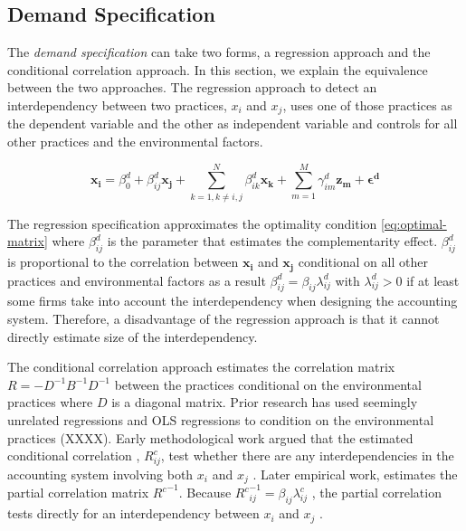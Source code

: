 \documentclass[12pt]{article}
\begin{document}
\subsection{Demand Specification}\label{demand-specification}

The \emph{demand specification} can take two forms, a regression approach and the conditional correlation approach. In this section, we explain the equivalence between the two approaches. The regression  approach to detect an interdependency between two practices, $x_i$ and $x_j$, uses one of those practices as the dependent variable and the other as independent variable and controls for all other practices and the environmental factors.

\begin{equation} \label{eq:demand-specification}
\mathbf{x_i} = \beta_0^d + \beta_{ij}^d \mathbf{x_j} 
		+ \sum_{k = 1, k \neq i,j}^N \beta_{ik}^d \mathbf{x_k} 
        + \sum_{m = 1}^M \gamma_{im}^d \mathbf{z_m}
        + \mathbf{\epsilon^d}
\end{equation}

The regression specification approximates the optimality condition  \eqref{eq:optimal-matrix} where \(\beta^d_{ij}\) is the parameter that estimates the complementarity effect. $\beta_{ij}^d$ is proportional to the  correlation between $\mathbf{x_i}$ and $\mathbf{x_j}$ conditional on all other practices and environmental factors as a result  $\beta^d_{ij} = \beta_{ij} \lambda^d_{ij}$ with $\lambda^d_{ij} > 0$ if at least some firms take into account the interdependency when designing the accounting system. Therefore, a disadvantage of the regression approach is that it cannot directly estimate size of the interdependency.

The conditional correlation approach estimates the correlation matrix $R = -D^{-1}B^{-1}D^{-1}$ between the practices  conditional on the environmental practices where $D$ is a diagonal matrix. Prior research has used seemingly unrelated regressions and OLS regressions to condition on the environmental practices (XXXX). Early methodological work argued that the estimated conditional correlation , $R^c_{ij}$, test whether there are any interdependencies in the accounting system involving both $x_i$ and $x_j$ \citep{Arora1996}.  Later empirical work, estimates the partial correlation matrix ${R^c}^{-1}$. Because ${R^c}^{-1}_{ij} = \beta_{ij} \lambda^c_{ij}$ , the partial correlation tests directly for an interdependency between $x_i$ and $x_j$ \citep{Indjejikian2012}. 
\end{document}
